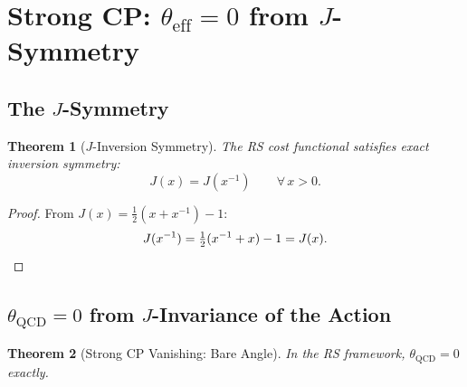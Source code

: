 \documentclass[12pt,a4paper]{article}
\newtheorem{theorem}{Theorem}[section]
\theoremstyle{definition}
\theoremstyle{remark}
\begin{document}
\section{Strong CP: $\theta_{\mathrm{eff}} = 0$ from
$J$-Symmetry}
\label{sec:strong-cp}

\subsection{The $J$-Symmetry}

\begin{theorem}[$J$-Inversion Symmetry]
\label{thm:j-sym}
The RS cost functional satisfies exact inversion symmetry:
\begin{equation}
  J(x) = J(x^{-1}) \qquad \forall\, x > 0.
  \label{eq:j-sym}
\end{equation}
\end{theorem}

\begin{proof}
From $J(x) = \tfrac{1}{2}(x + x^{-1}) - 1$:
\begin{equation}
  J(x^{-1}) = \tfrac{1}{2}(x^{-1} + x) - 1 = J(x).
  \qedhere
\end{equation}
\end{proof}

\subsection{$\theta_{\mathrm{QCD}} = 0$ from $J$-Invariance
of the Action}

\begin{theorem}[Strong CP Vanishing: Bare Angle]
\label{thm:theta-bare}
In the RS framework, $\theta_{\mathrm{QCD}} = 0$ exactly.
\end{theorem}
\end{document}
